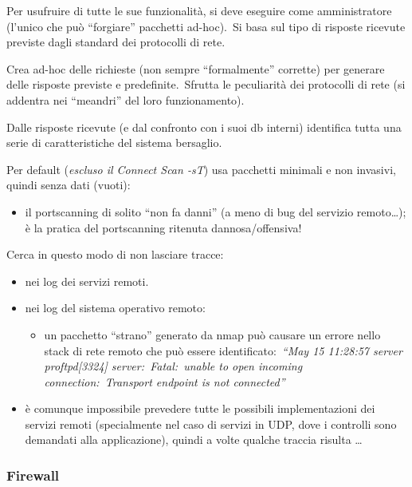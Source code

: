 Per usufruire di tutte le sue funzionalità, si deve eseguire come amministratore (l’unico che può ``forgiare'' pacchetti ad-hoc).\
Si basa sul tipo di risposte ricevute previste dagli standard dei protocolli di rete.

Crea ad-hoc delle richieste (non sempre ``formalmente'' corrette) per generare delle risposte previste e predefinite.\
Sfrutta le peculiarità dei protocolli di rete (si addentra nei ``meandri'' del loro funzionamento).

Dalle risposte ricevute (e dal confronto con i suoi db interni) identifica tutta una serie di caratteristiche del sistema bersaglio.

Per default (\emph{escluso il Connect Scan -sT}) usa pacchetti minimali e non invasivi, quindi senza dati (vuoti):
\begin{itemize}
    \item il portscanning di solito ``non fa danni'' (a meno di bug del servizio remoto\dots); è la pratica del portscanning ritenuta dannosa/offensiva!
\end{itemize}
Cerca in questo modo di non lasciare tracce:
\begin{itemize}
    \item nei log dei servizi remoti.
    \item nei log del sistema operativo remoto:
          \begin{itemize}
              \item un pacchetto ``strano'' generato da nmap può causare un errore nello stack di rete remoto che può essere identificato:\ \emph{``May 15 11:28:57 server proftpd[3324] server:\ Fatal:\ unable to open incoming connection:\ Transport endpoint is not connected''}
          \end{itemize}
    \item è comunque impossibile prevedere tutte le possibili implementazioni dei servizi remoti (specialmente nel caso di servizi in UDP, dove i controlli sono demandati alla applicazione), quindi a volte qualche traccia risulta \dots
\end{itemize}

\subsubsection{Firewall}


